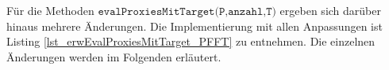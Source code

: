 
Für die Methoden $\texttt{evalProxiesMitTarget(P,anzahl,T)}$ ergeben sich darüber hinaus mehrere Änderungen. Die Implementierung mit allen Anpassungen ist Listing \ref{lst_erwEvalProxiesMitTarget_PFFT} zu entnehmen. Die einzelnen Änderungen werden im Folgenden erläutert.

